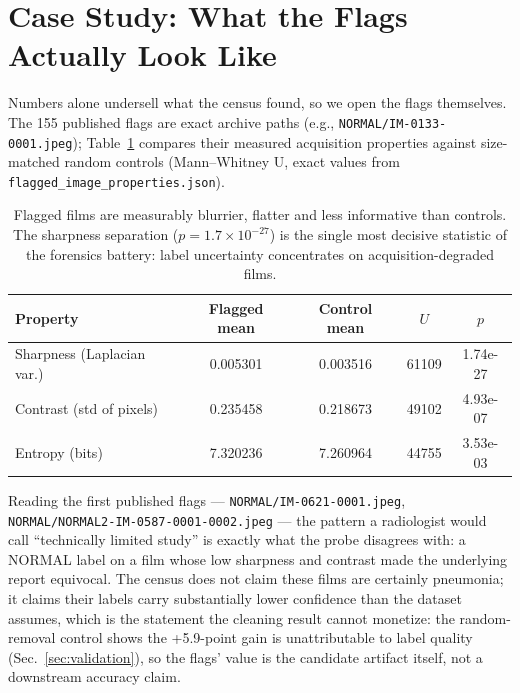 
\section{Case Study: What the Flags Actually Look Like}
\label{sec:flagcases}
Numbers alone undersell what the census found, so we open the flags
themselves. The 155 published flags are exact archive paths
(e.g., \texttt{NORMAL/IM-0133-0001.jpeg}); Table~\ref{tab:flagprops} compares their measured
acquisition properties against size-matched random controls
(Mann--Whitney U, exact values from
\texttt{flagged\_image\_properties.json}).
\begin{table}[h]
\centering\small
\begin{tabular}{lcccc}
\hline
Property & Flagged mean & Control mean & $U$ & $p$ \\
\hline
Sharpness (Laplacian var.) & 0.005301 & 0.003516 & 61109 & 1.74e-27 \\
Contrast (std of pixels) & 0.235458 & 0.218673 & 49102 & 4.93e-07 \\
Entropy (bits) & 7.320236 & 7.260964 & 44755 & 3.53e-03 \\
\hline
\end{tabular}
\caption{Flagged films are measurably blurrier, flatter and less
informative than controls. The sharpness separation
($p=1.7\times10^{-27}$) is the single most decisive statistic of the
forensics battery: label uncertainty concentrates on
acquisition-degraded films.}
\label{tab:flagprops}
\end{table}
Reading the first published flags --- \texttt{NORMAL/IM-0621-0001.jpeg}, \texttt{NORMAL/NORMAL2-IM-0587-0001-0002.jpeg} --- the
pattern a radiologist would call ``technically limited study'' is exactly
what the probe disagrees with: a NORMAL label on a film whose low
sharpness and contrast made the underlying report equivocal. The census
does not claim these films are certainly pneumonia; it claims their
labels carry substantially lower confidence than the dataset assumes,
which is the statement the cleaning result cannot monetize: the random-removal control shows the +5.9-point gain is unattributable to label quality (Sec.~\ref{sec:validation}), so the flags' value is the candidate artifact itself, not a downstream accuracy claim.

